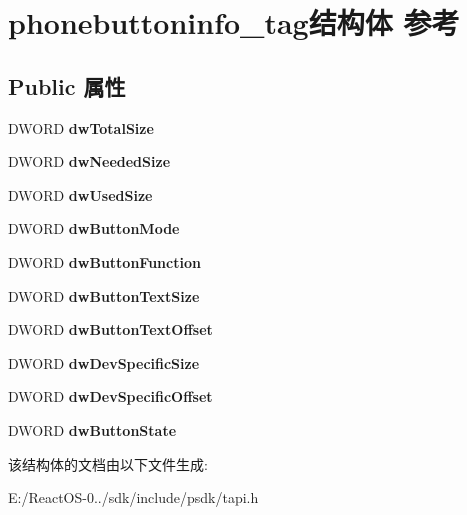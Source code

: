 \hypertarget{structphonebuttoninfo__tag}{}\section{phonebuttoninfo\+\_\+tag结构体 参考}
\label{structphonebuttoninfo__tag}
\subsection*{Public 属性}
\begin{DoxyCompactItemize}
\item 
\mbox{\label{structphonebuttoninfo__tag_abd894de5f3e6e0c8c9e37783f36a08ac}} 
D\+W\+O\+RD {\bfseries dw\+Total\+Size}
\item 
\mbox{\label{structphonebuttoninfo__tag_acf4fe124aaf7082a0e5723e0c69ae6d2}} 
D\+W\+O\+RD {\bfseries dw\+Needed\+Size}
\item 
\mbox{\label{structphonebuttoninfo__tag_a33db17e9dc627bfaaebdeb0ebd07901a}} 
D\+W\+O\+RD {\bfseries dw\+Used\+Size}
\item 
\mbox{\label{structphonebuttoninfo__tag_a2ef3f768309578de20f3cbc9e6fd5c05}} 
D\+W\+O\+RD {\bfseries dw\+Button\+Mode}
\item 
\mbox{\label{structphonebuttoninfo__tag_a3ecf0a38d3d4752469167a20bff55088}} 
D\+W\+O\+RD {\bfseries dw\+Button\+Function}
\item 
\mbox{\label{structphonebuttoninfo__tag_a5f155b2ee40a1bc78f0f5372cdfbdb7f}} 
D\+W\+O\+RD {\bfseries dw\+Button\+Text\+Size}
\item 
\mbox{\label{structphonebuttoninfo__tag_a5490348b7e98a0b9759d58115c132e5e}} 
D\+W\+O\+RD {\bfseries dw\+Button\+Text\+Offset}
\item 
\mbox{\label{structphonebuttoninfo__tag_a8bbae726eb96c7335888c87203f5fdc1}} 
D\+W\+O\+RD {\bfseries dw\+Dev\+Specific\+Size}
\item 
\mbox{\label{structphonebuttoninfo__tag_a5813155cbe54de6774f1aef8bcd7ca5e}} 
D\+W\+O\+RD {\bfseries dw\+Dev\+Specific\+Offset}
\item 
\mbox{\label{structphonebuttoninfo__tag_a1548ee3fda6fb95e75b1995e55e8aeb7}} 
D\+W\+O\+RD {\bfseries dw\+Button\+State}
\end{DoxyCompactItemize}


该结构体的文档由以下文件生成\+:\begin{DoxyCompactItemize}
\item 
E\+:/\+React\+O\+S-\/0../sdk/include/psdk/tapi.\+h\end{DoxyCompactItemize}
